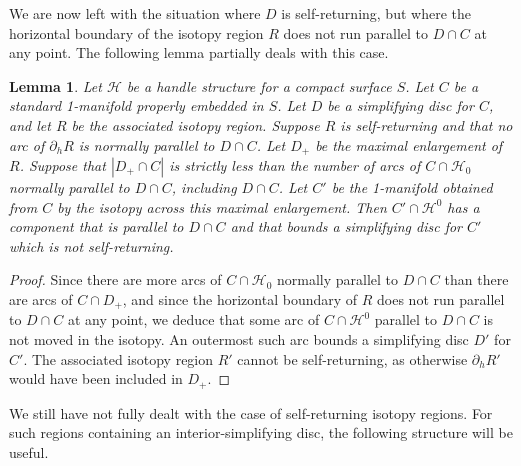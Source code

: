 \documentclass[oneside]{amsart}
\numberwithin{equation}{section}
\theoremstyle{plain}
\newtheorem{lemma}[equation]{Lemma}
\theoremstyle{definition}
\newcommand{\calH}{\mathcal{H}}
\begin{document}
We are now left with the situation where $D$ is self-returning, but where the horizontal boundary of the isotopy region $R$ does not run parallel to $D \cap C$ at any point. The following lemma partially deals with this case.

\begin{lemma}
\label{Lem:SelfReturningNotReeb}
Let $\calH$ be a handle structure for a compact surface $S$. Let $C$ be a standard 1-manifold properly embedded in $S$. Let $D$ be a simplifying disc for $C$, and let $R$ be the associated isotopy region. Suppose $R$ is self-returning and that no arc of $\partial_hR$ is normally parallel to $D \cap C$. Let $D_+$ be the maximal enlargement of $R$. Suppose that $|D_+ \cap C|$ is strictly less than the number of arcs of $C \cap \calH_0$ normally parallel to $D \cap C$, including $D \cap C$. Let $C'$ be the 1-manifold obtained from $C$ by the isotopy across this maximal enlargement. Then $C' \cap \calH^0$ has a component that is parallel to $D \cap C$ and that bounds a simplifying disc for $C'$ which is not self-returning.
\end{lemma}

\begin{proof}
Since there are more arcs of $C \cap \calH_0$ normally parallel to $D \cap C$ than there are arcs of $C \cap D_+$, and since the horizontal boundary of $R$ does not run parallel to $D \cap C$ at any point, we deduce that some arc of $C \cap \calH^0$ parallel to $D \cap C$ is not moved in the isotopy. An outermost such arc bounds a simplifying disc $D'$ for $C'$. The associated isotopy region $R'$ cannot be self-returning, as otherwise $\partial_h R'$ would have been included in $D_+$.
\end{proof}

We still have not fully dealt with the case of self-returning isotopy regions. For such regions containing an interior-simplifying disc, the following structure will be useful.
\end{document}
